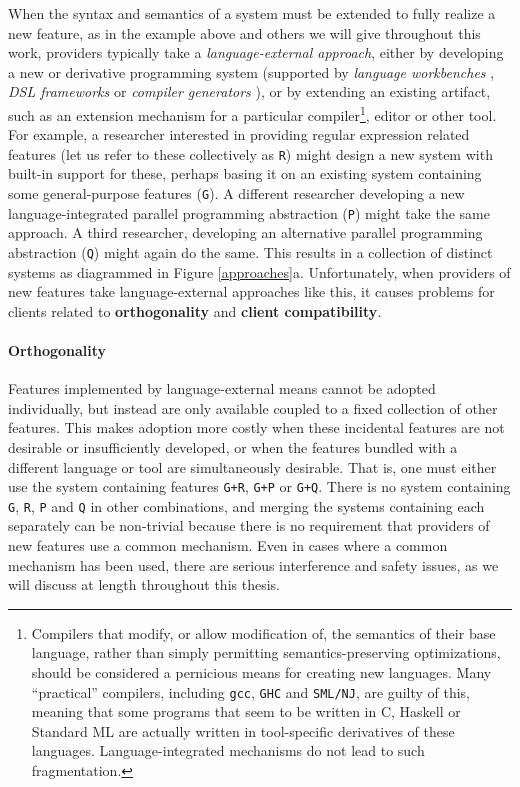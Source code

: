 When the syntax and semantics of a system must be extended to fully realize a new feature, as in the example above and others we will give throughout this work, providers typically take a \emph{language-external approach}, either by developing a new or derivative programming system (supported by \emph{language workbenches} \cite{erdweg2013state},  \emph{DSL frameworks} \cite{fowler2010domain} or \emph{compiler generators} \cite{brooker1963compiler}), or by extending an existing artifact, such as an extension mechanism for a {particular} compiler\footnote{Compilers that modify, or allow modification of, the semantics of their base language, rather than simply permitting semantics-preserving optimizations, should be considered a pernicious means for creating new languages. Many ``practical'' compilers, including \texttt{gcc}, \texttt{GHC} and \texttt{SML/NJ}, are guilty of this, meaning that some programs that seem to be written in C, Haskell or Standard ML are actually written in tool-specific derivatives of these languages. Language-integrated mechanisms do not lead to such fragmentation.}, editor or other tool. For example, a researcher interested in providing regular expression related features (let us refer to these collectively as \texttt{R}) might design a new system with built-in support for these, perhaps basing it on an existing system containing some general-purpose features (\texttt{G}). A different researcher developing a new language-integrated parallel programming abstraction (\texttt{P}) might  take the same approach. A third researcher, developing an alternative parallel programming abstraction (\texttt{Q}) might again do the same. This results in a collection of distinct systems as diagrammed in Figure \ref{approaches}a. Unfortunately, when providers of new features take language-external approaches like this, it causes  problems for clients related to \textbf{orthogonality} and \textbf{client compatibility}. %

\paragraph{Orthogonality} Features implemented by language-external means cannot be adopted individually, but instead are only available coupled to a fixed collection of other features. This makes adoption more costly when these incidental features are  not desirable or insufficiently developed, or when the features bundled with a different language or tool are simultaneously desirable. That is, one must either use the system containing features \texttt{G+R}, \texttt{G+P} or \texttt{G+Q}. There is no system containing \texttt{G}, \texttt{R}, \texttt{P} and \texttt{Q} in other combinations, and merging the systems containing each separately can be non-trivial because there is no requirement that providers of new features use a common mechanism. Even in cases where a common mechanism has been used, there are serious interference and safety issues, as we will discuss at length throughout this thesis.

